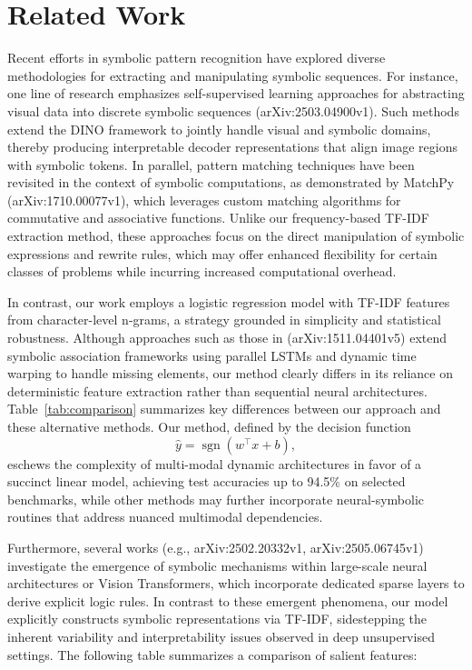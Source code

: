 \documentclass{article}
\begin{document}
\section{Related Work}
Recent efforts in symbolic pattern recognition have explored diverse methodologies for extracting and manipulating symbolic sequences. For instance, one line of research emphasizes self-supervised learning approaches for abstracting visual data into discrete symbolic sequences (arXiv:2503.04900v1). Such methods extend the DINO framework to jointly handle visual and symbolic domains, thereby producing interpretable decoder representations that align image regions with symbolic tokens. In parallel, pattern matching techniques have been revisited in the context of symbolic computations, as demonstrated by MatchPy (arXiv:1710.00077v1), which leverages custom matching algorithms for commutative and associative functions. Unlike our frequency-based TF-IDF extraction method, these approaches focus on the direct manipulation of symbolic expressions and rewrite rules, which may offer enhanced flexibility for certain classes of problems while incurring increased computational overhead.

In contrast, our work employs a logistic regression model with TF-IDF features from character-level n-grams, a strategy grounded in simplicity and statistical robustness. Although approaches such as those in (arXiv:1511.04401v5) extend symbolic association frameworks using parallel LSTMs and dynamic time warping to handle missing elements, our method clearly differs in its reliance on deterministic feature extraction rather than sequential neural architectures. Table~\ref{tab:comparison} summarizes key differences between our approach and these alternative methods. Our method, defined by the decision function 
\[
\hat{y} = \operatorname{sgn}(w^\top x + b),
\]
eschews the complexity of multi-modal dynamic architectures in favor of a succinct linear model, achieving test accuracies up to 94.5\% on selected benchmarks, while other methods may further incorporate neural-symbolic routines that address nuanced multimodal dependencies.

Furthermore, several works (e.g., arXiv:2502.20332v1, arXiv:2505.06745v1) investigate the emergence of symbolic mechanisms within large-scale neural architectures or Vision Transformers, which incorporate dedicated sparse layers to derive explicit logic rules. In contrast to these emergent phenomena, our model explicitly constructs symbolic representations via TF-IDF, sidestepping the inherent variability and interpretability issues observed in deep unsupervised settings. The following table summarizes a comparison of salient features:
\end{document}

